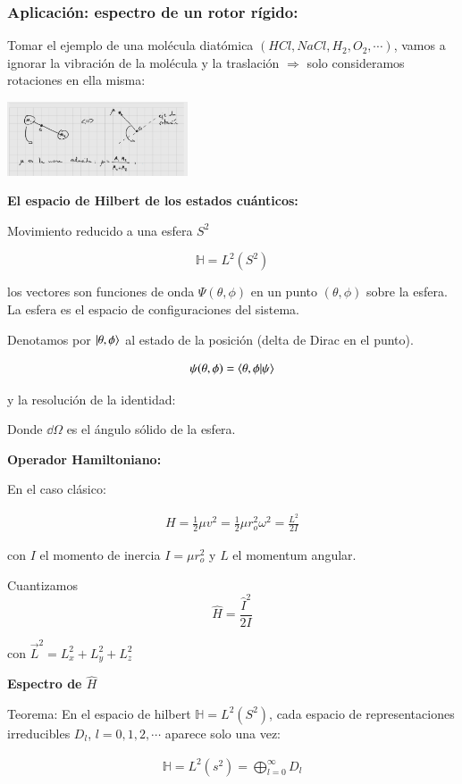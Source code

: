 \subsubsection{Aplicación: espectro de un rotor rígido:}

Tomar el ejemplo de una molécula diatómica $(HCl,NaCl,H_2,O_2,\cdots)$, vamos a ignorar la vibración de la molécula y la traslación $\Rightarrow$ solo consideramos rotaciones en ella misma:

\includegraphics[width=0.4\textwidth]{Graficas/G1-Aug2.png}

\textbf{El espacio de Hilbert de los estados cuánticos:}

Movimiento reducido a una esfera $S^2$

$$
\mathbb{H}=L^2(S^2)
$$

los vectores son funciones de onda $\Psi(\theta,\phi)$ en un punto $(\theta,\phi)$ sobre la esfera.
La esfera es el espacio de configuraciones del sistema.

Denotamos por $\ket{\theta,\phi}$ al estado de la posición (delta de Dirac en el punto).

$$
\psi(\theta,\phi)=\bra{\theta,\phi}\ket{\psi}
$$

y la resolución de la identidad:

Donde $\dd\Omega$ es el ángulo sólido de la esfera.

\textbf{Operador Hamiltoniano:}

En el caso clásico:

\begin{align*}
    H=\frac{1}{2}\mu v^2=\frac{1}{2} \mu r_o^2\omega^2=\frac{L^2}{2I}
\end{align*}

con $I$ el momento de inercia $I=\mu r_o^2$ y $L$ el momentum angular.

Cuantizamos 
$$
\hat{H}=\frac{\hat{I}^2}{2I}
$$

con $\vec{L}^2=L_x^2+L_y^2+L_z^2$

\textbf{Espectro de $\hat{H}$}

Teorema: En el espacio de hilbert $\mathbb{H}=L^2(S^2)$, cada espacio de representaciones irreducibles $D_l$, $l=0,1,2,\cdots$ aparece solo una vez:

\begin{align*}
    \mathbb{H}=L^2(s^2)=\bigoplus_{l=0}^\infty D_l
\end{align*}


